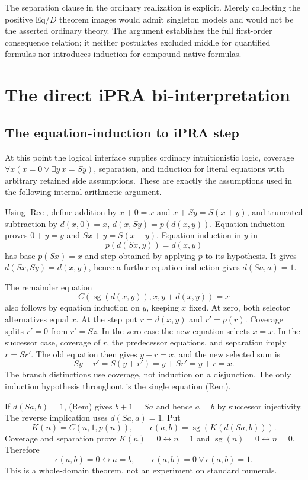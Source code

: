 \documentclass[10pt,letterpaper]{article}
\theoremstyle{definition}
\theoremstyle{remark}
\begin{document}
The separation clause in the ordinary realization is explicit. Merely
collecting the positive Eq/$D$ theorem images would admit singleton models
and would not be the asserted ordinary theory. The argument establishes the
full first-order consequence relation; it neither postulates excluded middle
for quantified formulas nor introduces induction for compound native formulas.


\section{The direct iPRA bi-interpretation}\label{sec:biinterp}
\subsection{The equation-induction to iPRA step}

At this point the logical interface supplies ordinary intuitionistic logic,
coverage $\forall x(x=0\lor\exists y\,x=Sy)$, separation, and induction
for literal equations with arbitrary retained side assumptions. These are
exactly the assumptions used in the following internal arithmetic argument.

Using $\operatorname{Rec}$, define addition by $x+0=x$ and
$x+Sy=S(x+y)$, and truncated subtraction by
$d(x,0)=x$, $d(x,Sy)=p(d(x,y))$. Equation induction proves
$0+y=y$ and $Sx+y=S(x+y)$. Equation induction in $y$ in
\[
 p(d(Sx,y))=d(x,y)
\]
has base $p(Sx)=x$ and step obtained by applying $p$ to its hypothesis.
It gives $d(Sx,Sy)=d(x,y)$, hence a further equation induction gives
$d(Sa,a)=1$.

The remainder equation
\[
 C(\operatorname{sg}(d(x,y)),x,y+d(x,y))=x
\tag{Rem}
\]
also follows by equation induction on $y$, keeping $x$ fixed. At zero,
both selector alternatives equal $x$. At the step put $r=d(x,y)$ and
$r'=p(r)$. Coverage splits $r'=0$ from $r'=Sz$. In the zero case
the new equation selects $x=x$. In the successor case, coverage of $r$,
the predecessor equations, and separation imply $r=Sr'$. The old equation
then gives $y+r=x$, and the new selected sum is
\[
 Sy+r'=S(y+r')=y+Sr'=y+r=x.
\]
The branch distinctions use coverage, not induction on a disjunction.
The only induction hypothesis throughout is the single equation (Rem).

If $d(Sa,b)=1$, (Rem) gives $b+1=Sa$ and hence $a=b$ by
successor injectivity. The reverse implication uses $d(Sa,a)=1$.
Put
\[
 K(n)=C(n,1,p(n)),\qquad
 \epsilon(a,b)=\operatorname{sg}(K(d(Sa,b))).
\]
Coverage and separation prove $K(n)=0\leftrightarrow n=1$ and
$\operatorname{sg}(n)=0\leftrightarrow n=0$. Therefore
\[
 \epsilon(a,b)=0\leftrightarrow a=b,
 \qquad \epsilon(a,b)=0\lor\epsilon(a,b)=1.
\]
This is a whole-domain theorem, not an experiment on standard numerals.
\end{document}
